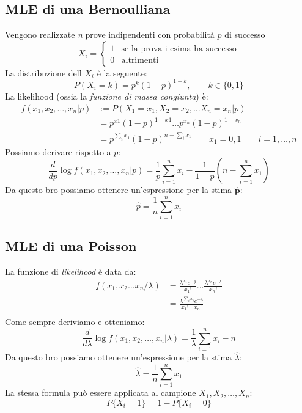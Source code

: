 \documentclass[]{article}
\begin{document}
    \subsection{MLE di una Bernoulliana}
    Vengono realizzate \textit{n} prove indipendenti con probabilità $p$ di successo
    \begin{equation*}
        X_i =
        \begin{cases}
            1 & \text{se la prova i-esima ha successo} \\
            0 & \text{altrimenti}
        \end{cases}
    \end{equation*}
    La distribuzione dell $X_i$ è la seguente:
    \[ P(X_i = k) = p^k (1-p)^{1-k}, \qquad k \in \{0,1\} \]
    La likelihood (ossia la \textit{funzione di massa congiunta}) è:
    \begin{equation*}
        \begin{split}
            f(x_1, x_2, \ldots, x_n \rvert p) &:= P(X_1 = x_1, X_2 = x_2, \ldots X_n = x_n \rvert p) \\
            &= p^{x1}(1-p)^{1-x1} \ldots p^{x_n}(1-p)^{1-x_n} \\
            &= p^{\sum_{i}^{} x_1}(1-p)^{n- \sum_{i}^{} x_1} \qquad x_1 = 0,1 \qquad i = 1, \ldots, n
        \end{split}
    \end{equation*}
    Possiamo derivare rispetto a $p$:
    \[ \frac{d}{dp} \log f(x_1, x_2, \ldots, x_n \rvert p) = \frac{1}{p} \sum_{i = 1}^{n} x_i - \frac{1}{1- p} \left(n-\sum_{i = 1}^{n} x_1 \right) \]
    Da questo bro possiamo ottenere un'espressione per la stima $\boldsymbol{\hat{p}}$:
    \[ \hat{p} = \frac{1}{n} \sum_{i = 1}^{n} x_i \]
    \subsection{MLE di una Poisson}
    La funzione di \textit{likelihood} è data da:
    \begin{equation*}
        \begin{split}
            f(x_1, x_2 \ldots x_n / \lambda) &= \frac{\lambda^{x_1} e^{-y}}{x_1!} \ldots \frac{\lambda^{x_n} e^{-\lambda}}{x_n!} \\
            &= \frac{\lambda^{\sum_{i}^{} x_i} e^{-\lambda}}{x_1 ! \ldots x_n !} \\
        \end{split}
    \end{equation*}
    Come sempre deriviamo e otteniamo:
    \[ \frac{d}{d\lambda} \log f(x_1, x_2, \ldots, x_n \rvert \lambda) = \frac{1}{\lambda} \sum_{i = 1}^{n} x_i - n \]
    Da questo bro possiamo ottenere un'espressione per la stima $\hat{\lambda}$:
    \[ \hat{\lambda} = \frac{1}{n} \sum_{i = 1}^{n} x_1 \]
    La stessa formula può essere applicata al campione $X_1, X_2, \ldots, X_n$:
    \[ P\{X_i = 1\} = 1 - P\{X_i = 0\} \]
\end{document}
